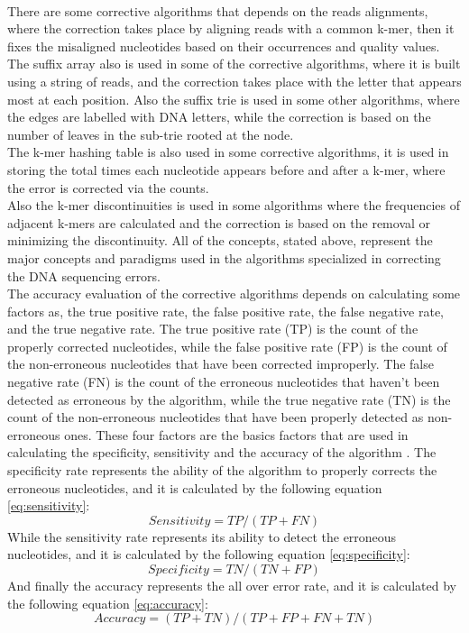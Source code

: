 \documentclass[12pt,openany]{llncs}
\begin{document}
\\
There are some corrective algorithms that depends on the reads alignments, where the correction takes place by aligning reads with a common k-mer, then it fixes the misaligned nucleotides based on their occurrences and quality values.
The suffix array also is used in some of the corrective algorithms, where it is built using a string of reads, and the correction takes place with the letter that appears most at each position. Also the suffix trie is used in some other algorithms, where the edges are labelled with DNA letters, while the correction is based on the number of leaves in the sub-trie rooted at the node.
\\
The k-mer hashing table is also used in some corrective algorithms, it is used in storing the total times each nucleotide appears before and after a k-mer, where the error is corrected via the counts. 
\\
Also the k-mer discontinuities is used in some algorithms where the frequencies of adjacent k-mers are calculated and the correction is based on the removal or minimizing the discontinuity.
All of the concepts, stated above, represent the major concepts and paradigms used in the algorithms specialized in correcting the DNA sequencing errors.
\\
The accuracy evaluation of the corrective algorithms depends on calculating some factors as, the true positive rate, the false positive rate, the false negative rate, and the true negative rate. The true positive rate (TP) is the count of the properly corrected nucleotides, while the false positive rate (FP) is the count of the non-erroneous nucleotides that have been corrected improperly. The false negative rate (FN) is the count of the erroneous nucleotides that haven't been detected as erroneous by the algorithm, while the true negative rate (TN) is the count of the non-erroneous nucleotides that have been properly detected as non-erroneous ones. These four factors are the basics factors that are used in calculating the specificity, sensitivity and the accuracy of the algorithm \cite{analysis}. The specificity rate represents the ability of the algorithm to properly corrects the erroneous nucleotides, and it is calculated by the following equation \ref{eq:sensitivity}:
\begin{equation} \label{eq:sensitivity}
  Sensitivity = TP/(TP+FN) 
\end{equation}
While the sensitivity rate represents its ability to detect the erroneous nucleotides, and it is calculated by the following equation \ref{eq:specificity}: 
\begin{equation} \label{eq:specificity}
  Specificity = TN/(TN+FP) 
\end{equation}
And finally the accuracy represents the all over error rate, and it is calculated by the following equation \ref{eq:accuracy}:
\begin{equation} \label{eq:accuracy}
  Accuracy = (TP+TN)/(TP+FP+FN+TN)
\end{equation} 
\end{document}
